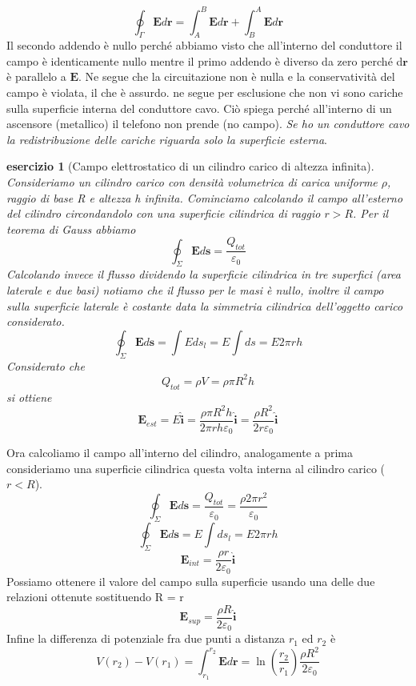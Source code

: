 \documentclass[10pt,a4paper]{article}
\newtheorem{esercizio}{esercizio}
\begin{document}
\begin{enumerate}
\[\oint_{\Gamma}\mathbf{E}d\mathbf{r}= \int_{A}^{B}\mathbf{E}d\mathbf{r}+\int_{B}^{A}\mathbf{E}d\mathbf{r}\]
Il secondo addendo è nullo perché abbiamo visto che all'interno del conduttore il campo è identicamente nullo mentre il primo addendo è diverso da zero perché d$\mathbf{r}$ è parallelo a $\mathbf{E}$. Ne segue che la circuitazione non è nulla e la conservatività del campo è violata, il che è assurdo. ne segue per esclusione che non vi sono cariche sulla superficie interna del conduttore cavo. Ciò spiega perché all'interno di un ascensore (metallico) il telefono non prende (no campo). 
\textit{Se ho un conduttore cavo la redistribuzione delle cariche riguarda solo la superficie esterna}. 
\end{enumerate}
\begin{esercizio}[Campo elettrostatico di un cilindro carico di altezza infinita]
Consideriamo un cilindro carico con densità volumetrica di carica uniforme $\rho$, raggio di base R e altezza h infinita. Cominciamo calcolando il campo all'esterno del cilindro circondandolo con una superficie cilindrica di raggio \(r>R\). Per il teorema di Gauss abbiamo
\[\oint_{\Sigma}\mathbf{E}d\mathbf{s}=\frac{Q_{tot}}{\varepsilon_0}\]
Calcolando invece il flusso dividendo la superficie cilindrica in tre superfici (area laterale e due basi) notiamo che il flusso per le masi è nullo, inoltre il campo sulla superficie laterale è costante data la simmetria cilindrica dell'oggetto carico considerato.
\[\oint_{\Sigma}\mathbf{E}d\mathbf{s}=\int E ds_l = E\int ds = E2\pi r h\]
Considerato che
\[Q_{tot} = \rho V = \rho \pi R^2 h\]
si ottiene
\[\mathbf{E}_{est} = E \hat{\mathbf{i}} = \frac{\rho \pi R^2 h }{2\pi r h \varepsilon_0} \hat{\mathbf{i}}= \frac{\rho R^2 }{2 r \varepsilon_0}\hat{\mathbf{i}}\]
\end{esercizio}
Ora calcoliamo il campo all'interno del cilindro, analogamente a prima consideriamo una superficie cilindrica questa volta interna al cilindro carico (\(r<R\)). 
\[\oint_{\Sigma}\mathbf{E}d\mathbf{s}=\frac{Q_{tot}}{\varepsilon_0} = \frac{\rho 2 \pi r^2}{\varepsilon_0}\]
\[\oint_{\Sigma}\mathbf{E}d\mathbf{s}=E\int ds_l = E2\pi rh\]
\[\mathbf{E}_{int} = \frac{\rho r}{2\varepsilon_0}\hat{\mathbf{i}}\]
Possiamo ottenere il valore del campo sulla superficie usando una delle due relazioni ottenute sostituendo R = r
\[\mathbf{E}_{sup} = \frac{\rho R}{2\varepsilon_0}\hat{\mathbf{i}}\]
Infine la differenza di potenziale fra due punti a distanza \(r_1\) ed \(r_2\) è
\[V(r_2)-V(r_1) = \int_{r_1}^{r_2}\mathbf{E}d\mathbf{r}=\ln\left(\frac{r_2}{r_1}\right)\frac{\rho R^2}{2\varepsilon_0}\]
\end{document}
